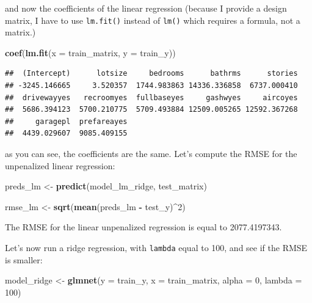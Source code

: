 \documentclass[]{gitbook}
\newenvironment{Shaded}{\begin{snugshade}}{\end{snugshade}}
\newcommand{\DataTypeTok}[1]{\textcolor[rgb]{0.13,0.29,0.53}{#1}}
\newcommand{\DecValTok}[1]{\textcolor[rgb]{0.00,0.00,0.81}{#1}}
\newcommand{\KeywordTok}[1]{\textcolor[rgb]{0.13,0.29,0.53}{\textbf{#1}}}
\newcommand{\NormalTok}[1]{#1}
\newcommand{\OperatorTok}[1]{\textcolor[rgb]{0.81,0.36,0.00}{\textbf{#1}}}
\newcommand{\StringTok}[1]{\textcolor[rgb]{0.31,0.60,0.02}{#1}}
\theoremstyle{definition}
\theoremstyle{definition}
\theoremstyle{definition}
\theoremstyle{remark}
\begin{document}
and now the coefficients of the linear regression (because I provide a
design matrix, I have to use \texttt{lm.fit()} instead of \texttt{lm()}
which requires a formula, not a matrix.)

\begin{Shaded}
\begin{Highlighting}[]
\KeywordTok{coef}\NormalTok{(}\KeywordTok{lm.fit}\NormalTok{(}\DataTypeTok{x =}\NormalTok{ train_matrix, }\DataTypeTok{y =}\NormalTok{ train_y))}
\end{Highlighting}
\end{Shaded}

\begin{verbatim}
##  (Intercept)      lotsize     bedrooms      bathrms      stories 
## -3245.146665     3.520357  1744.983863 14336.336858  6737.000410 
##  drivewayyes   recroomyes  fullbaseyes     gashwyes     aircoyes 
##  5686.394123  5700.210775  5709.493884 12509.005265 12592.367268 
##     garagepl  prefareayes 
##  4439.029607  9085.409155
\end{verbatim}

as you can see, the coefficients are the same. Let's compute the RMSE
for the unpenalized linear regression:

\begin{Shaded}
\begin{Highlighting}[]
\NormalTok{preds_lm <-}\StringTok{ }\KeywordTok{predict}\NormalTok{(model_lm_ridge, test_matrix)}

\NormalTok{rmse_lm <-}\StringTok{ }\KeywordTok{sqrt}\NormalTok{(}\KeywordTok{mean}\NormalTok{(preds_lm }\OperatorTok{-}\StringTok{ }\NormalTok{test_y)}\OperatorTok{^}\DecValTok{2}\NormalTok{)}
\end{Highlighting}
\end{Shaded}

The RMSE for the linear unpenalized regression is equal to 2077.4197343.

Let's now run a ridge regression, with \texttt{lambda} equal to 100, and
see if the RMSE is smaller:

\begin{Shaded}
\begin{Highlighting}[]
\NormalTok{model_ridge <-}\StringTok{ }\KeywordTok{glmnet}\NormalTok{(}\DataTypeTok{y =}\NormalTok{ train_y, }\DataTypeTok{x =}\NormalTok{ train_matrix, }\DataTypeTok{alpha =} \DecValTok{0}\NormalTok{, }\DataTypeTok{lambda =} \DecValTok{100}\NormalTok{)}
\end{Highlighting}
\end{Shaded}
\end{document}
